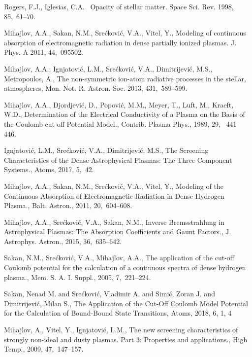 \documentclass[a1]{sciposter}
\begin{document}
\begin{multicols}{3}
\begin{thebibliography}{99}
 Rogers, F.J., Iglesias, C.A.~ Opacity of stellar matter. Space Sci. Rev. 1998, 85,~61--70.
 
 Mihajlov, A.A., Sakan, N.M., Sre{\'c}kovi{\'c}, V.A., {Vitel}, Y., Modeling of continuous 
  absorption of electromagnetic radiation in dense partially ionized plasmas. J. Phys. A 2011, 44,~095502.
  
 {Mihajlov}, A.A.; {Ignjatovi{\'c}}, L.M., {Sre{\'c}kovi{\'c}}, V.A.,
  {Dimitrijevi{\'c}}, M.S., {Metropoulos}, A., The non-symmetric ion-atom radiative processes in the stellar, atmospheres, Mon. Not. R. Astron. Soc. 2013, 431,~589--599.
 
 Mihajlov, A.A., Djordjević, D., Popović, M.M., Meyer, T., Luft, M., Kraeft, W.D., Determination of the Electrical Conductivity of a Plasma on the Basis
  of the Coulomb cut-off Potential Model., Contrib. Plasma Phys., 1989, 29, ~441--446.
  
 {Ignjatovi{\'c}}, L.M., {Sre{\'c}kovi{\'c}}, V.A., {Dimitrijevi{\'c}}, M.S., The Screening Characteristics of the Dense Astrophysical Plasmas: The
  Three-Component Systems., Atoms, 2017, 5,~42.

 Mihajlov, A.A., {Sakan}, N.M., {Sre{\'c}kovi{\'c}}, V.A., {Vitel}, Y., Modeling of the Continuous Absorption of Electromagnetic Radiation in Dense Hydrogen Plasma., 
  Balt. Astron., 2011, 20,~604--608.
  
 {Mihajlov}, A.A., {Sre{\'c}kovi{\'c}}, V.A., {Sakan}, N.M., Inverse Bremsstrahlung in Astrophysical Plasmas: The Absorption
  Coefficients and Gaunt Factors., J. Astrophys. Astron., 2015, 36,~635--642. 

 {Sakan}, N.M., {Sre{\'c}kovi{\'c}}, V.A., {Mihajlov}, A.A., The application of the cut-off Coulomb potential for the calculation
  of a continuous spectra of dense hydrogen plasma., Mem. S. A. I. Suppl., 2005, 7,~221--224.

 Sakan, Nenad M. and Srećković, Vladimir A. and Simić, Zoran J. and Dimitrijević, Milan S., 
The Application of the Cut-Off Coulomb Model Potential for the Calculation of Bound-Bound State Transitions, Atoms, 2018, 6, 1, 4

 Mihajlov, A., Vitel, Y., Ignjatovi{\'c}, L.M., The new screening characteristics of strongly non-ideal and dusty
  plasmas. Part 3: Properties and applications., High Temp., 2009, 47,~147--157.
  

\end{thebibliography}
\end{multicols}
\end{document}
